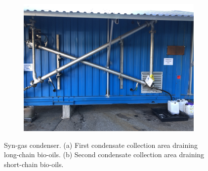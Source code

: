 \begin{figure}
        \centering
         \begin{subfigure}[t]{\linewidth}
         \centering
         \includegraphics[width=0.74\linewidth,scale=0.74]{Bilder/Pyrolysis/Condenser.png}
         \caption{}
         \label{fig:condenserfull}
     \end{subfigure}
           \hspace{0.5cm}
        \caption{Syn-gas condenser. (a) First condensate collection area draining long-chain bio-oils. (b) Second condensate collection area draining short-chain bio-oils.}
        \label{fig:condenser}
\end{figure}


